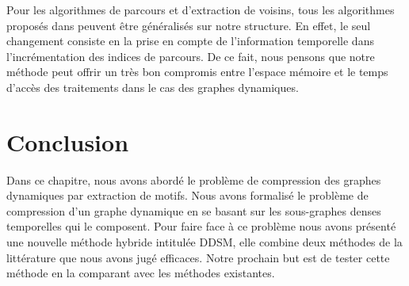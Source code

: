 			Pour les algorithmes de parcours et d'extraction de voisins, tous les algorithmes proposés dans \citep{hernandez2014compressed} peuvent être généralisés sur notre structure. En effet, le seul changement consiste en la  prise en compte de l'information temporelle dans l'incrémentation des indices de parcours. De ce fait, nous pensons que notre méthode peut offrir un très bon compromis entre l'espace mémoire et le temps d'accès des traitements dans le cas des graphes dynamiques. 
			
		\section{Conclusion}
	Dans ce chapitre, nous avons abordé le problème de compression des graphes dynamiques par extraction de motifs. Nous avons formalisé le problème de compression d'un graphe dynamique en se basant sur les sous-graphes denses temporelles qui le composent. Pour faire face à ce problème nous avons présenté une nouvelle méthode hybride intitulée DDSM, elle combine deux méthodes de la littérature que nous avons jugé efficaces. Notre prochain but est de tester cette méthode en la comparant avec les méthodes existantes.   

	